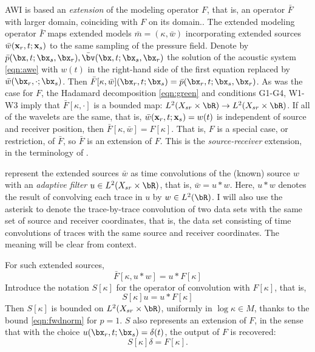 AWI is based an {\em extension} of the modeling operator $F$, that is,
an operator ${\bar F}$ with larger domain, coinciding with $F$ on its domain..
The extended modeling operator ${\bar F}$ maps extended models
$\bar{m}=(\kappa,\bar{w})$ incorporating extended sources
$\bar{w}({\bf x}_r,t;{\bf x}_s)$ to the same sampling of the pressure
field. Denote by $\bar{p}(\bx,t;\bx_s,\bx_r), \bar{\bv}(\bx,t;\bx_s,\bx_r)$
the solution of the acoustic system \ref{eqn:awe} with $w(t)$ in the
right-hand side of the first equation replaced by
$\bar{w}(\bx_r,\cdot;\bx_s)$. Then
$\bar{F}[\kappa,\bar{w}](\bx_r,t;\bx_s) =
\bar{p}(\bx_r,t;\bx_s,\bx_r)$. As was the case for $F$, the Hadamard
decomposition \ref{eqn:green} and conditions G1-G4, W1-W3 imply that
$\bar{F}[\kappa, \cdot]$ is a bounded map: $L^2(X_{sr} \times \bR)
\rightarrow L^2(X_{sr} \times \bR)$. If all  
of the wavelets are the same, that is, ${\bar w}({\bf  
  x}_r,t;{\bf x}_s) = w(t)$ is independent of source and receiver  
position, then ${\bar F}[\kappa,\bar{w}] = F[\kappa]$. That is, $F$ is a special
case, or restriction, of ${\bar F}$, so ${\bar F}$ is an extension of
$F$. This is the {\em source-receiver} extension, in the terminology of \cite{HuangSymes2015SEG}.

\cite{Warner:16} represent the extended sources $\bar{w}$ as time convolutions of the
(known) source $w$ with an {\em adaptive filter} $u \in L^2(X_{sr}
\times \bR)$, that is, $\bar{w}=u * w$.
Here, $u*w$ denotes the result of convolving each trace in $u$ by $w
\in L^2(\bR)$. I
will also use the asterisk to denote the trace-by-trace convolution
of two data sets with the same set of source and receiver coordinates,
that is, the data set consisting of time convolutions of traces with the same source
and receiver coordinates. The meaning will be clear from context.

For such extended sources,
\[
  \bar{F}[\kappa,u*w] = u*F[\kappa]
\]
Introduce the notation $S[\kappa]$ for the operator of convolution
with $F[\kappa]$, that is,
\begin{equation}
  \label{eqn:sdef}
  S[\kappa]u = u*F[\kappa]
\end{equation}
Then $S[\kappa]$ is bounded on $L^2(X_{sr} \times \bR)$, uniformly in
$\log \kappa \in M$, thanks to
the bound \ref{eqn:fwdnorm} for $p=1$. $S$ also represents an
extension of $F$, in the sense that with the choice
$u(\bx_r,t;\bx_s)=\delta(t)$, the output of $F$ is recovered:
\begin{equation}
  \label{eqn:sconsist}
  S[\kappa]\delta = F[\kappa].
\end{equation}

